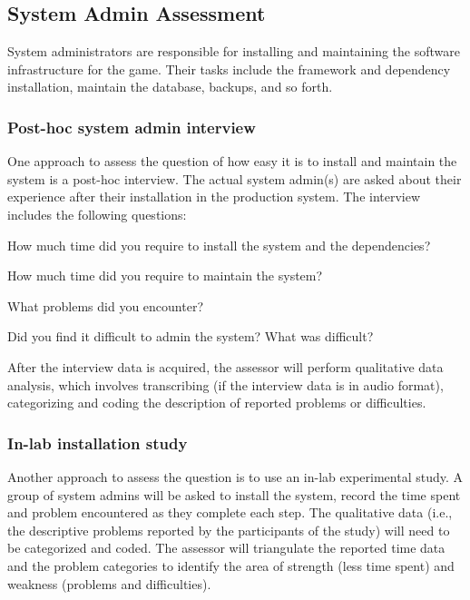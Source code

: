 \documentclass[11pt]{article}
\begin{document}
\subsection{System Admin Assessment}

System administrators are responsible for installing and maintaining the software infrastructure
for the game. Their tasks include the framework and dependency installation, maintain the database, backups, and so forth.

\subsubsection{Post-hoc system admin interview}
\label{Post-hoc system admin interview}

One approach to assess the question of how easy it is to install and maintain the system is a post-hoc interview. The actual system admin(s) are asked about their experience after their installation in the production system. The interview includes the following questions:\\

\begin{compactitem}
\item How much time did you require to install the system and the dependencies?
\item How much time did you require to maintain the system?
\item What problems did you encounter?
\item Did you find it difficult to admin the system? What was difficult?\\
\end{compactitem}

After the interview data is acquired, the assessor will perform qualitative data
analysis, which involves transcribing (if the interview data is in audio format),
categorizing and coding the description of reported problems or difficulties.

\subsubsection{In-lab installation study}
\label{In-lab installation study}

Another approach to assess the question is to use an in-lab experimental study. A group of system admins will 
be asked to install the system, record the time
spent and problem encountered as they complete each step. The qualitative data (i.e., the
descriptive problems reported by the participants of the study) will need to be categorized and
coded. The assessor will triangulate the reported time data and the problem categories to identify
the area of strength (less time spent) and weakness (problems and difficulties).
\end{document}
